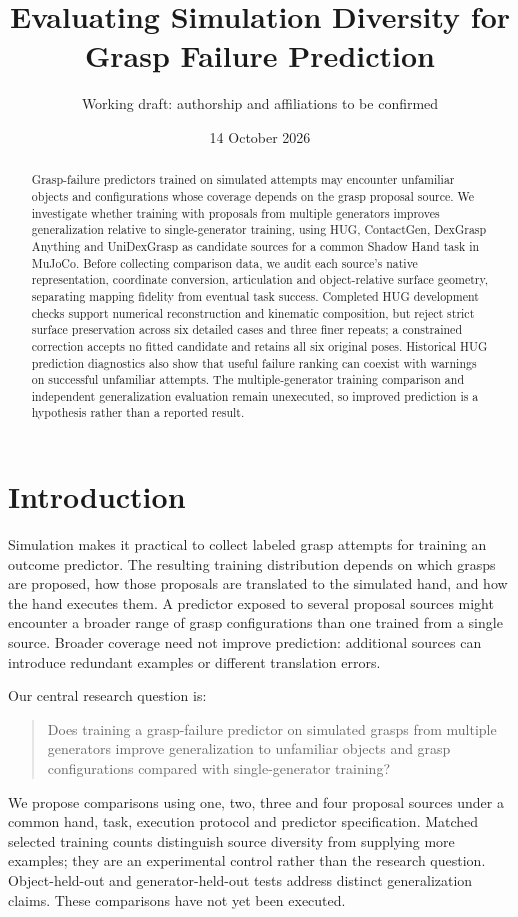 \documentclass[10pt,letterpaper]{article}
\title{Evaluating Simulation Diversity for Grasp Failure Prediction}
\author{Working draft: authorship and affiliations to be confirmed}
\date{14 October 2026}
\begin{document}
\maketitle

\begin{abstract}
Grasp-failure predictors trained on simulated attempts may encounter unfamiliar
objects and configurations whose coverage depends on the grasp proposal source.
We investigate whether training with proposals from multiple generators improves
generalization relative to single-generator training, using HUG, ContactGen,
DexGrasp Anything and UniDexGrasp as candidate sources for a common Shadow Hand
task in MuJoCo. Before collecting comparison data, we audit each source's native
representation, coordinate conversion, articulation and object-relative surface
geometry, separating mapping fidelity from eventual task success.
Completed HUG development checks support numerical reconstruction and kinematic
composition, but reject strict surface preservation across six detailed cases
and three finer repeats; a constrained correction accepts no fitted candidate
and retains all six original poses. Historical HUG prediction diagnostics also
show that useful failure ranking can coexist with warnings on successful
unfamiliar attempts. The multiple-generator training comparison and independent
generalization evaluation remain unexecuted, so improved prediction is a
hypothesis rather than a reported result.
\end{abstract}


\section{Introduction}
Simulation makes it practical to collect labeled grasp attempts for training an
outcome predictor. The resulting training distribution depends on which grasps
are proposed, how those proposals are translated to the simulated hand, and how
the hand executes them. A predictor exposed to several proposal sources might
encounter a broader range of grasp configurations than one trained from a single
source. Broader coverage need not improve prediction: additional sources can
introduce redundant examples or different translation errors.

Our central research question is:
\begin{quote}
Does training a grasp-failure predictor on simulated grasps from multiple
generators improve generalization to unfamiliar objects and grasp configurations
compared with single-generator training?
\end{quote}
We propose comparisons using one, two, three and four proposal sources under a
common hand, task, execution protocol and predictor specification. Matched
selected training counts distinguish source diversity from supplying more
examples; they are an experimental control rather than the research question.
Object-held-out and generator-held-out tests address distinct generalization
claims. These comparisons have not yet been executed.
\end{document}

